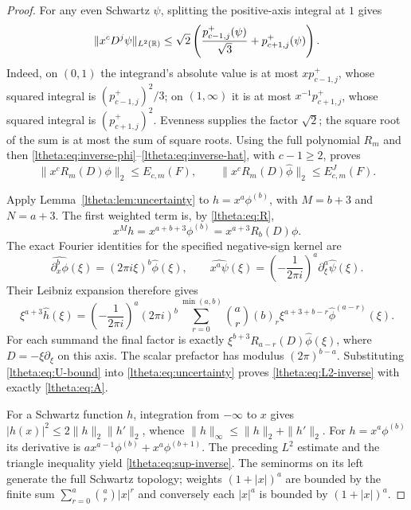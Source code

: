 \begin{proof}
For any even Schwartz $\psi$, splitting the positive-axis integral at
$1$ gives
\[
 \|x^cD^j\psi\|_{L^2(\mathbb R)}
 \leq\sqrt2\left(\frac{p^+_{c-1,j}(\psi)}{\sqrt3}
                               +p^+_{c+1,j}(\psi)\right).
\]
Indeed, on $(0,1)$ the integrand's absolute value is at most
$xp^+_{c-1,j}$, whose squared integral is $(p^+_{c-1,j})^2/3$;
on $(1,\infty)$ it is at most $x^{-1}p^+_{c+1,j}$, whose squared
integral is $(p^+_{c+1,j})^2$. Evenness supplies the factor $\sqrt2$;
the square root of the sum is at most the sum of square roots.
Using the full polynomial $R_m$ and then
\eqref{ltheta:eq:inverse-phi}--\eqref{ltheta:eq:inverse-hat}, with $c-1\geq2$, proves
\begin{equation}\label{ltheta:eq:U-bound}
 \|x^cR_m(D)\phi\|_2\leq E_{c,m}(F),\qquad
 \|x^cR_m(D)\widehat\phi\|_2\leq E^J_{c,m}(F).
\end{equation}

Apply Lemma~\ref{ltheta:lem:uncertainty} to
$h=x^a\phi^{(b)}$, with $M=b+3$ and $N=a+3$. The first weighted
term is, by \eqref{ltheta:eq:R},
\[
 x^Mh=x^{a+b+3}\phi^{(b)}=x^{a+3}R_b(D)\phi.
\]
The exact Fourier identities for the specified negative-sign kernel are
\[
 \widehat{\partial_x^b\phi}(\xi)=(2\pi i\xi)^b\widehat\phi(\xi),
 \qquad
 \widehat{x^a\psi}(\xi)=\left(-\frac1{2\pi i}\right)^a
                                      \partial_\xi^a\widehat\psi(\xi).
\]
Their Leibniz expansion therefore gives
\[
 \xi^{a+3}\widehat h(\xi)
 =\left(-\frac1{2\pi i}\right)^a(2\pi i)^b
 \sum_{r=0}^{\min(a,b)}\binom ar(b)_r
       \xi^{a+3+b-r}\widehat\phi^{(a-r)}(\xi).
\]
For each summand the final factor is exactly
$\xi^{b+3}R_{a-r}(D)\widehat\phi(\xi)$, where
$D=-\xi\partial_\xi$ on this axis. The scalar prefactor has modulus
$(2\pi)^{b-a}$. Substituting \eqref{ltheta:eq:U-bound} into
\eqref{ltheta:eq:uncertainty} proves \eqref{ltheta:eq:L2-inverse} with exactly
\eqref{ltheta:eq:A}.

For a Schwartz function $h$, integration from $-\infty$ to $x$ gives
$|h(x)|^2\leq2\|h\|_2\|h'\|_2$, whence
$\|h\|_\infty\leq\|h\|_2+\|h'\|_2$.
For $h=x^a\phi^{(b)}$ its derivative is
$a x^{a-1}\phi^{(b)}+x^a\phi^{(b+1)}$. The preceding $L^2$ estimate
and the triangle inequality yield \eqref{ltheta:eq:sup-inverse}. The
seminorms on its left generate the full Schwartz topology; weights
$(1+|x|)^a$ are bounded by the finite sum
$\sum_{r=0}^a\binom ar|x|^r$ and conversely each $|x|^a$ is bounded by
$(1+|x|)^a$.
\end{proof}

